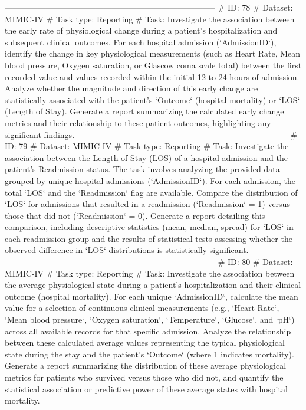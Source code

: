 \begin{tcolorbox}[colback=cadmiumgreen!5!white,colframe=forestgreen!75!white,breakable,title=\textit{Generated analytical tasks in task 4.}]
\begin{VerbatimWrap}
-----------------------------------------------------------------------------
# ID: 78  
# Dataset: MIMIC-IV 
# Task type: Reporting
# Task: Investigate the association between the early rate of physiological change during a patient's hospitalization and subsequent clinical outcomes. For each hospital admission (`AdmissionID`), identify the change in key physiological measurements (such as Heart Rate, Mean blood pressure, Oxygen saturation, or Glascow coma scale total) between the first recorded value and values recorded within the initial 12 to 24 hours of admission. Analyze whether the magnitude and direction of this early change are statistically associated with the patient's `Outcome` (hospital mortality) or `LOS` (Length of Stay). Generate a report summarizing the calculated early change metrics and their relationship to these patient outcomes, highlighting any significant findings.
-----------------------------------------------------------------------------
# ID: 79  
# Dataset: MIMIC-IV 
# Task type: Reporting
# Task: Investigate the association between the Length of Stay (LOS) of a hospital admission and the patient's Readmission status. The task involves analyzing the provided data grouped by unique hospital admissions (`AdmissionID`). For each admission, the total `LOS` and the `Readmission` flag are available. Compare the distribution of `LOS` for admissions that resulted in a readmission (`Readmission` = 1) versus those that did not (`Readmission` = 0). Generate a report detailing this comparison, including descriptive statistics (mean, median, spread) for `LOS` in each readmission group and the results of statistical tests assessing whether the observed difference in `LOS` distributions is statistically significant.
-----------------------------------------------------------------------------
# ID: 80  
# Dataset: MIMIC-IV 
# Task type: Reporting
# Task: Investigate the association between the average physiological state during a patient's hospitalization and their clinical outcome (hospital mortality). For each unique `AdmissionID`, calculate the mean value for a selection of continuous clinical measurements (e.g., `Heart Rate`, `Mean blood pressure`, `Oxygen saturation`, `Temperature`, `Glucose`, and `pH`) across all available records for that specific admission. Analyze the relationship between these calculated average values representing the typical physiological state during the stay and the patient's `Outcome` (where 1 indicates mortality). Generate a report summarizing the distribution of these average physiological metrics for patients who survived versus those who did not, and quantify the statistical association or predictive power of these average states with hospital mortality.

\end{VerbatimWrap}
\end{tcolorbox}
